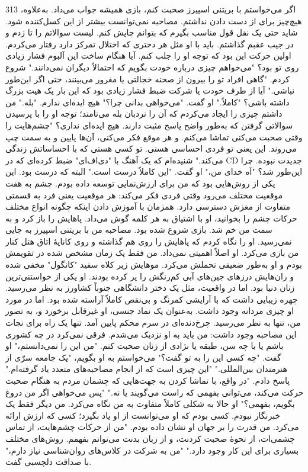 313  
اگر می‌خواستم با بریتنی اسپیرز صحبت کنم، بازی همیشه جواب می‌داد. به‌علاوه، هیچ‌چیز برای از دست دادن نداشتم. مصاحبه نمی‌توانست بیشتر از این کسل‌کننده شود. شاید حتی یک نقل قول مناسب بگیرم که بتوانم چاپش کنم.  
لیست سوالاتم را تا زدم و در جیب عقبم گذاشتم. باید با او مثل هر دختری که اختلال تمرکز دارد رفتار می‌کردم.  
اولین حرکت این بود که توجه او را جلب کنم.  
آیا هنگام ساخت این آلبوم فشار زیادی روی تو بود؟  
"می‌خواهم چیزی درباره خودت بگویم که احتمالاً دیگران نمی‌دانند." شروع کردم. "گاهی افراد تو را بیرون از صحنه خجالتی یا مغرور می‌بینند، حتی اگر این‌طور نباشی."  
آیا از طرف خودت یا شرکت ضبط فشار زیادی بود که این بار یک هیت بزرگ داشته باشی؟  
"کاملاً." او گفت.  
"می‌خواهی بدانی چرا؟"  
هیچ ایده‌ای ندارم.  
"بله." من داشتم چیزی را ایجاد می‌کردم که آن را نردبان بله می‌نامند؛ توجه او را با پرسیدن سوالاتی گرفتن که به‌طور واضح پاسخ مثبت دارند.  
هیچ ایده‌ای نداری؟  
"چشم‌هایت را وقتی صحبت می‌کنی تماشا می‌کنم. و هر موقع فکر می‌کنی، آن‌ها پایین و به سمت چپ می‌روند. این یعنی تو فردی احساسی هستی. تو کسی هستی که با احساساتش زندگی می‌کند."  
شنیده‌ام که یک آهنگ با "دی‌اف‌ای" ضبط کرده‌ای که در CD جدیدت نبوده. چرا این‌طور شد؟  
"آه خدای من،" او گفت. "این کاملاً درست است."  
البته که درست بود. این یکی از روش‌هایی بود که من برای ارزش‌نمایی توسعه داده بودم. چشم به هفت موقعیت مختلف می‌رود وقتی فردی فکر می‌کند: هر موقعیت یعنی فرد به قسمتی متفاوت از مغزش دسترسی دارد.  
همزمان با آموزش دادن اینکه چگونه انواع مختلف حرکات چشم را بخوانید، او با اشتیاق به هر کلمه گوش می‌داد. پاهایش را باز کرد و به سمت من خم شد.  
بازی شروع شده بود.  
مصاحبه من با بریتنی اسپیرز به جایی نمی‌رسید. او را نگاه کردم که پاهایش را روی هم گذاشته و روی کاناپهٔ اتاق هتل کنار من بازی می‌کرد. او اصلاً اهمیتی نمی‌داد. من فقط یک زمان مشخص شده در تقویمش بودم و او به‌طور ضعیفی تحملش می‌کرد.  
موهایش زیر کلاه سفید "کانگول" مخفی شده و ران‌هایش درزهای جین‌های آبی کم‌رنگش را پر کرده بودند. او یکی از خواستنی‌ترین زنان دنیا بود. اما در واقعیت، مثل یک دختر دانشگاهی جنوباً کشاورز به نظر می‌رسید.  
چهره زیبایی داشت که با آرایشی کمرنگ و بی‌نقص کاملاً آراسته شده بود. اما در مورد او چیزی مردانه وجود داشت. به‌عنوان یک نماد جنسی، او غیرقابل برخورد و، به تصور من، تنها به نظر می‌رسید.  
چرخ‌دنده‌ای در سرم محکم پایین آمد.  
تنها یک راه برای نجات این مصاحبه وجود داشت: من باید به او نزدیک می‌شدم. فرقی نمی‌کرد در چه کشوری باشم یا با چه سن، طبقه یا نژادی از زنان صحبت کنم.  
"من این را نمی‌دانستم،" او گفت. "چه کسی این را به تو گفت؟"  
می‌خواستم به او بگویم، "یک جامعه سرّی از هنرمندان بین‌المللی."  
"این چیزی است که از انجام مصاحبه‌های متعدد یاد گرفته‌ام." پاسخ دادم. "در واقع، با تماشا کردن به جهت‌هایی که چشمان مردم به هنگام صحبت حرکت می‌کند، می‌توانی بفهمی که راست می‌گویند یا نه."  
"پس می‌خواهی اگر من دروغ بگویم، بفهمی؟" او حالا به شکلی کاملاً متفاوت به من نگاه می‌کرد. من دیگر فقط یک خبرنگار نبودم. کسی بودم که او می‌توانست از او یاد بگیرد؛ کسی که ارزش ارائه می‌کرد. من قدرت را بر جهان او نشان داده بودم.  
"من از حرکات چشم‌هایت، از تماس چشمی‌ات، از نحوهٔ صحبت کردنت، و از زبان بدنت می‌توانم بفهمم. روش‌های مختلف بسیاری برای این کار وجود دارد."  
"من به شرکت در کلاس‌های روان‌شناسی نیاز دارم،" با صداقت دلچسبی گفت.